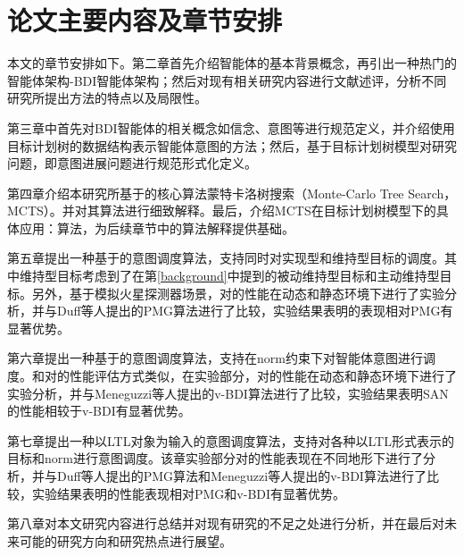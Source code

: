 \section{论文主要内容及章节安排}
本文的章节安排如下。第二章首先介绍智能体的基本背景概念，再引出一种热门的智能体架构-BDI智能体架构；然后对现有相关研究内容进行文献述评，分析不同研究所提出方法的特点以及局限性。

第三章中首先对BDI智能体的相关概念如信念、意图等进行规范定义，并介绍使用目标计划树的数据结构表示智能体意图的方法；然后，基于目标计划树模型对研究问题，即意图进展问题进行规范形式化定义。

第四章介绍本研究所基于的核心算法蒙特卡洛树搜索（Monte-Carlo Tree Search，MCTS）。并对其算法进行细致解释。最后，介绍MCTS在目标计划树模型下的具体应用：\SA 算法，为后续章节中的算法解释提供基础。

第五章提出一种基于\SA 的意图调度算法\SAM ，\SAM 支持同时对实现型和维持型目标的调度。其中维持型目标考虑到了在第\ref{background}中提到的被动维持型目标和主动维持型目标。另外，基于模拟火星探测器场景，对\SAM 的性能在动态和静态环境下进行了实验分析，并与Duff等人提出的PMG\cite{DBLP:conf/atal/DuffHT06}算法进行了比较，实验结果表明\SAM 的表现相对PMG有显著优势。

第六章提出一种基于\SA 的意图调度算法\SAN ，\SAN 支持在norm约束下对智能体意图进行调度。和对\SAM 的性能评估方式类似，在实验部分，对\SAN 的性能在动态和静态环境下进行了实验分析，并与Meneguzzi等人提出的v-BDI\cite{DBLP:journals/eaai/MeneguzziROVL15}算法进行了比较，实验结果表明SAN的性能相较于v-BDI有显著优势。

第七章提出一种以LTL对象为输入的意图调度算法\SAT，支持对各种以LTL形式表示的目标和norm进行意图调度。该章实验部分对\SAT 的性能表现在不同地形下进行了分析，并与Duff等人提出的PMG\cite{DBLP:conf/atal/DuffHT06}算法和Meneguzzi等人提出的v-BDI算法进行了比较，实验结果表明\SAT 的性能表现相对PMG和v-BDI有显著优势。

第八章对本文研究内容进行总结并对现有研究的不足之处进行分析，并在最后对未来可能的研究方向和研究热点进行展望。
